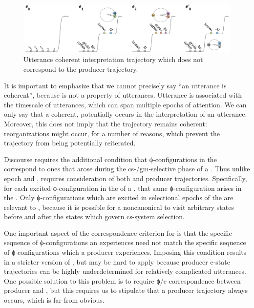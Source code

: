   
\begin{figure}
\includegraphics[width=\textwidth]{figures/Tilsen-img126.png}
\caption{Utterance coherent interpretation trajectory which does not correspond to the producer trajectory.}
\label{fig:6:7}
\end{figure}
 

  It is important to emphasize that we cannot precisely say “an utterance is coherent”, because  is not a property of utterances. Utterance  is  associated with the timescale of utterances, which can span multiple epochs of attention. We can only say that a coherent, potentially  occurs in the interpretation of an utterance. Moreover, this does not imply that the trajectory remains coherent: reorganizations might occur, for a number of reasons, which prevent the trajectory from being potentially reiterated.

  Discourse  requires the additional condition that ϕ-configurations in the   correspond to ones that arose during the cs-/gm-selective phase of a . Thus unlike epoch and ,  requires consideration of both  and producer trajectories. Specifically, for each excited ϕ-configuration in the  of a , that same ϕ-configuration arises in the . Only ϕ-configurations which are excited in selectional epochs of the  are relevant to , because it is possible for a noncanonical  to visit arbitrary states before and after the states which govern cs-system selection. 

  One important aspect of the correspondence criterion for  is that the specific sequence of ϕ-configurations an  experiences need not match the specific sequence of ϕ-configurations which a producer experiences. Imposing this condition results in a stricter version of , but may be hard to apply because producer e-state trajectories can be highly underdetermined for relatively complicated utterances. One possible solution to this problem is to require ϕ/e  correspondence between producer and , but this requires us to stipulate that a  producer trajectory always occurs, which is far from obvious.

